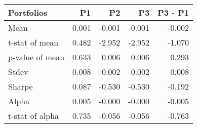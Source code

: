 \begin{tabular}{lrrrr}
\toprule
Portfolios & P1 & P2 & P3 & P3 - P1 \\
\midrule
Mean & 0.001 & -0.001 & -0.001 & -0.002 \\
t-stat of mean & 0.482 & -2.952 & -2.952 & -1.070 \\
p-value of mean & 0.633 & 0.006 & 0.006 & 0.293 \\
Stdev & 0.008 & 0.002 & 0.002 & 0.008 \\
Sharpe & 0.087 & -0.530 & -0.530 & -0.192 \\
Alpha & 0.005 & -0.000 & -0.000 & -0.005 \\
t-stat of alpha & 0.735 & -0.056 & -0.056 & -0.763 \\
\bottomrule
\end{tabular}
